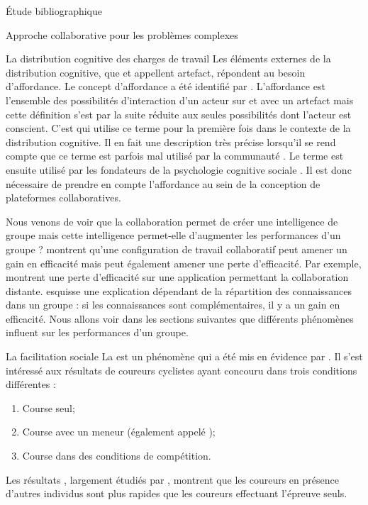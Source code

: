 \documentclass[myfrancais,ngerman,english,frenchb]{mythesis}
\begin{document}
\begin{mychapter}{Étude bibliographique}
\begin{mysection}{Approche collaborative pour les problèmes complexes}
\begin{mysubsection}{La distribution cognitive des charges de travail}
				Les éléments externes de la distribution cognitive, que  et  appellent artefact, répondent au besoin d'affordance.
				Le concept d'affordance a été identifié par .
				L'affordance est l'ensemble des possibilités d'interaction d'un acteur sur et avec un artefact  mais cette définition s'est par la suite réduite aux seules possibilités dont l'acteur est conscient.
				C'est  qui utilise ce terme pour la première fois dans le contexte de la distribution cognitive.
				Il en fait une description très précise lorsqu'il se rend compte que ce terme est parfois mal utilisé par la communauté .
				Le terme est ensuite utilisé par les fondateurs de la psychologie cognitive sociale .
				Il est donc nécessaire de prendre en compte l'affordance au sein de la conception de plateformes collaboratives.

				Nous venons de voir que la collaboration permet de créer une intelligence de groupe mais cette intelligence permet-elle d'augmenter les performances d'un groupe ?
				 montrent qu'une configuration de travail collaboratif peut amener un gain en efficacité mais peut également amener une perte d'efficacité.
				Par exemple,  montrent une perte d'efficacité sur une application permettant la collaboration distante.
				 esquisse une explication dépendant de la répartition des connaissances dans un groupe : si les connaissances sont complémentaires, il y a un gain en efficacité.
				Nous allons voir dans les sections suivantes que différents phénomènes influent sur les performances d'un groupe.
			\end{mysubsection}
			\begin{mysubsection}{La facilitation sociale}
				La  est un phénomène qui a été mis en évidence par .
				Il s'est intéressé aux résultats de coureurs cyclistes ayant concouru dans trois conditions différentes :
				\begin{enumerate}
					\item Course seul;
					\item Course avec un meneur (également appelé );
					\item Course dans des conditions de compétition.
				\end{enumerate}
				Les résultats , largement étudiés par , montrent que les coureurs en présence d'autres individus sont plus rapides que les coureurs effectuant l'épreuve seuls.


\end{mysubsection}
\end{mysection}
\end{mychapter}
\end{document}
